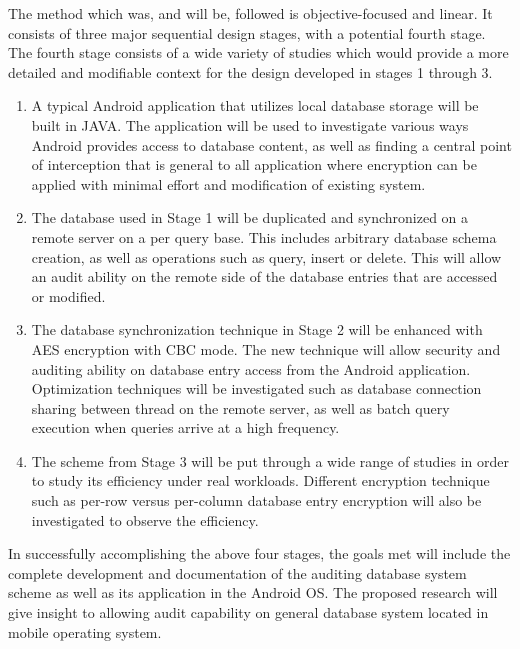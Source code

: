 The method which was, and will be, followed is objective-focused and linear. It consists of three major sequential design stages, with a potential fourth stage. The fourth stage consists of a wide variety of studies which would provide a more detailed and modifiable context for the design developed in stages 1 through 3.

\begin{enumerate}
  \item A typical Android application that utilizes local database storage will be built in JAVA. The application will be used to investigate various ways Android provides access to database content, as well as finding a central point of interception that is general to all application where encryption can be applied with minimal effort and modification of existing system.
  \item The database used in Stage 1 will be duplicated and synchronized on a remote server on a per query base. This includes arbitrary database schema creation, as well as operations such as query, insert or delete. This will allow an audit ability on the remote side of the database entries that are accessed or modified.
  \item The database synchronization technique in Stage 2 will be enhanced with AES encryption with CBC mode. The new technique will allow security and auditing ability on database entry access from the Android application. Optimization techniques will be investigated such as database connection sharing between thread on the remote server, as well as batch query execution when queries arrive at a high frequency.
  \item The scheme from Stage 3 will be put through a wide range of studies in order to study its efficiency under real workloads. Different encryption technique such as per-row versus per-column database entry encryption will also be investigated to observe the efficiency.
\end{enumerate}

In successfully accomplishing the above four stages, the goals met will include the complete development and documentation of the auditing database system scheme as well as its application in the Android OS. The proposed research will give insight to allowing audit capability on general database system located in mobile operating system.
